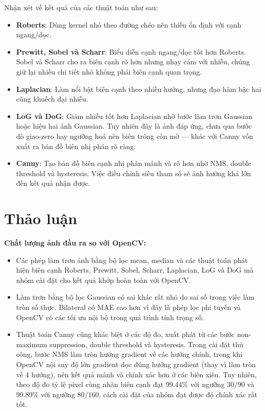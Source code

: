 \documentclass[12pt]{article}
\newcommand{\runin}[1]{\par\medskip\noindent\textbf{#1}\hspace{0.4em}\ignorespaces}
\numberwithin{equation}{section}
\begin{document}
Nhận xét về kết quả của các thuật toán như sau:
\begin{itemize}
  \item \textbf{Roberts}: Dùng kernel nhỏ theo đường chéo nên thiếu ổn định với cạnh ngang/dọc.
  \item \textbf{Prewitt, Sobel và Scharr}: Biểu diễn cạnh ngang/dọc tốt hơn Roberts. Sobel và Scharr cho ra biên cạnh rõ hơn nhưng nhạy cảm với nhiễu, chúng giữ lại nhiều chi tiết nhỏ không phải biên cạnh quan trọng.
  \item \textbf{Laplacian}: Làm nổi bật biên cạnh theo nhiều hướng, nhưng đạo hàm bậc hai cũng khuếch đại nhiễu.
  \item \textbf{LoG và DoG}: Giảm nhiễu tốt hơn Laplacian nhờ bước làm trơn Gaussian hoặc hiệu hai ảnh Gaussian. Tuy nhiên đây là ảnh đáp ứng, chưa qua bước dò giao-zero hay ngưỡng hoá nên biên trông còn mờ --- khác với Canny vốn xuất ra bản đồ biên nhị phân rõ ràng.
  \item \textbf{Canny}: Tạo bản đồ biên cạnh nhị phân mảnh và rõ hơn nhờ NMS, double threshold và hysteresis. Việc điều chỉnh siêu tham số sẽ ảnh hưởng khá lớn đến kết quả nhận được.
\end{itemize}

\section{Thảo luận}

\runin{Chất lượng ảnh đầu ra so với OpenCV:}
\begin{itemize}
  \item Các phép làm trơn ảnh bằng bộ lọc mean, median và các thuật toán phát hiện biên cạnh Roberts, Prewitt, Sobel, Scharr, Laplacian, LoG và DoG mà nhóm cài đặt cho kết quả khớp hoàn toàn với OpenCV.
 \item Làm trơn bằng bộ lọc Gaussian có sai khác rất nhỏ do sai số trong việc làm tròn số thực. Bilateral có MAE cao hơn vì đây là phép lọc phi tuyến và OpenCV có các tối ưu nội bộ trong quá trình tính trọng số.
 \item Thuật toán Canny cũng khác biệt ở các độ đo, xuất phát từ các bước non-maximum suppression, double threshold và hysteresis. Trong cài đặt thủ công, bước NMS làm tròn hướng gradient về các hướng chính, trong khi OpenCV nội suy độ lớn gradient dọc đúng hướng gradient (thay vì làm tròn về 4 hướng), nên kết quả mảnh và chính xác hơn ở các biên xiên. Tuy nhiên, theo độ đo tỷ lệ pixel cùng nhãn biên cạnh đạt 99.44\% với ngưỡng $30/90$ và 99.89\% với ngưỡng $80/160$, cách cài đặt của nhóm đạt được độ chính xác rất tốt.
\end{itemize}
\end{document}
